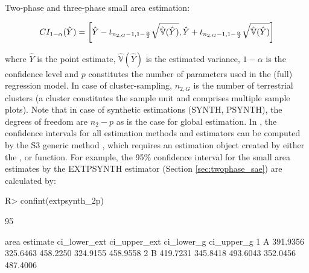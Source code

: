 \documentclass[article]{jss}
\newcommand{\var}{\mathbb{V}}
\begin{document}
Two-phase and three-phase small area estimation:

\begin{equation}\label{ci_2phase_sae}
CI_{1-\alpha}(\hat{Y})=\bigg{\lbrack}\hat{Y}-t_{n_{2,G}-1, 1-\frac{\alpha}{2}}\sqrt{\hat{\var}(\hat{Y})},
                              \hat{Y}+t_{n_{2,G}-1, 1-\frac{\alpha}{2}}\sqrt{\hat{\var}(\hat{Y})}\bigg{\rbrack}
\end{equation}

\vspace{4mm}

where $\hat{Y}$ is the point estimate, $\hat{\var}(\hat{Y})$ is the estimated variance, $1-\alpha$ is the confidence level and $p$ constitutes the number of parameters used in the (full) regression model. In case of cluster-sampling, $n_{2,G}$ is the number of terrestrial clusters (a cluster constitutes the sample unit and comprises multiple sample plots). Note that in case of synthetic estimations (SYNTH, PSYNTH), the degrees of freedom are $n_{2}-p$ as is the case for global estimation. In , the confidence intervals for all estimation methods and estimators can be computed by the S3 generic method , which requires an estimation object created by either the ,  or  function. For example, the 95\% confidence interval for the small area estimates by the EXTPSYNTH estimator (Section \ref{sec:twophase_sae}) are calculated by:


\begin{Schunk}
\begin{Sinput}
R> confint(extpsynth_2p)
\end{Sinput}
\begin{Soutput}
95%
 
  area estimate ci_lower_ext ci_upper_ext ci_lower_g ci_upper_g
1    A 391.9356     325.6463     458.2250   324.9155   458.9558
2    B 419.7231     345.8418     493.6043   352.0456   487.4006
\end{Soutput}
\end{Schunk}




%
%
\end{document}
